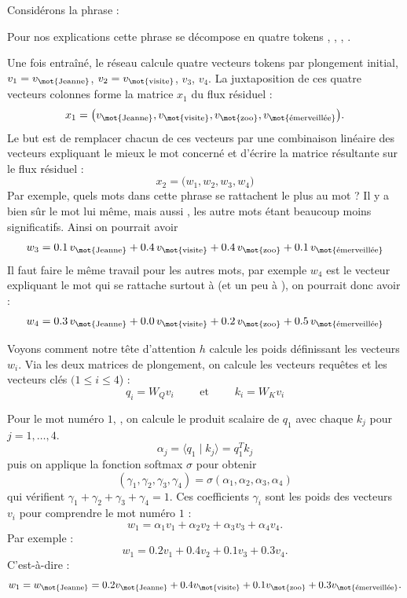 \documentclass[11pt,class=report,crop=false]{standalone}
\begin{document}
Considérons la phrase :


Pour nos explications cette phrase se décompose en quatre tokens , ,
, . 

Une fois entraîné, le réseau calcule quatre vecteurs tokens par plongement initial,
$v_1 =  v_{\text{\mot{Jeanne}}}$, $v_2 = v_{\text{\mot{visite}}}$, $v_3$, $v_4$.
La juxtaposition de ces quatre vecteurs colonnes forme la matrice $x_1$ du flux résiduel :
$$x_ 1 = \big( 
v_{\text{\mot{Jeanne}}},
v_{\text{\mot{visite}}}, 
v_{\text{\mot{zoo}}},
v_{\text{\mot{émerveillée}}} \big).$$
Le but est de remplacer chacun de ces vecteurs par une combinaison linéaire des vecteurs expliquant le mieux le mot concerné et d'écrire la matrice résultante sur le flux résiduel :
$$x_2 = \big(w_1, w_2, w_3, w_4\big)$$
Par exemple, quels mots dans cette phrase se rattachent le plus au mot  ?
Il y a bien sûr le mot  lui même, mais aussi , les autre mots étant beaucoup moins significatifs. Ainsi on pourrait avoir 
$$w_3 = 
0.1 \, v_{\text{\mot{Jeanne}}}
+ 0.4 \,v_{\text{\mot{visite}}}
+ 0.4\, v_{\text{\mot{zoo}}}
+0.1\, v_{\text{\mot{émerveillée}}}
$$
Il faut faire le même travail pour les autres mots, par exemple $w_4$ est le vecteur expliquant le mot  qui se rattache surtout à  (et un peu à ), on pourrait donc avoir :
$$w_4 = 
0.3 \,v_{\text{\mot{Jeanne}}}
+ 0.0\, v_{\text{\mot{visite}}}
+ 0.2\, v_{\text{\mot{zoo}}}
+0.5\, v_{\text{\mot{émerveillée}}}
$$


Voyons comment notre tête d'attention $h$ calcule les poids définissant les vecteurs $w_i$.
Via les deux matrices de plongement, on calcule les vecteurs requêtes et les vecteurs clés $(1 \le i \le 4$) :
$$q_i =  W_Q v_i \qquad \text{ et } \qquad k_i =  W_K v_i$$


Pour le mot numéro $1$, , on calcule le produit scalaire de $q_1$ avec chaque $k_j$ pour $j=1,\ldots,4$.
$$\alpha_j = \langle q_1 \mid k_j \rangle = q_1^T k_j$$
puis on applique la fonction softmax $\sigma$ pour obtenir 
$$(\gamma_1, \gamma_2, \gamma_3, \gamma_4)  = \sigma(\alpha_1, \alpha_2, \alpha_3, \alpha_4)$$
qui vérifient $\gamma_1 + \gamma_2 + \gamma_3 + \gamma_4 = 1$.
Ces coefficients $\gamma_i$ sont les poids des vecteurs $v_i$ pour comprendre le mot numéro $1$ :
$$w_1 = \alpha_1 v_1 + \alpha_2 v_2 + \alpha_3 v_3 + \alpha_4 v_4.$$
Par exemple :
$$w_1 = 0.2 v_1 + 0.4 v_2 + 0.1 v_3 + 0.3 v_4.$$ 
C'est-à-dire :
$$w_1 = w_{\text{\mot{Jeanne}}} = 0.2 v_{\text{\mot{Jeanne}}} + 0.4 v_{\text{\mot{visite}}} + 0.1 v_{\text{\mot{zoo}}} + 0.3 v_{\text{\mot{émerveillée}}}.$$ 
\end{document}
